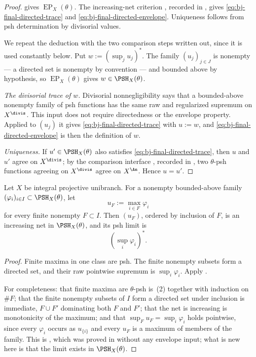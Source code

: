 \begin{proof}
 gives $\operatorname{EP}_X(\theta)$.
The increasing-net criterion
\cite[Theorem~5.11]{BJ22}, recorded in
, gives
\eqref{eq:bj-final-directed-trace} and
\eqref{eq:bj-final-directed-envelope}.
Uniqueness follows from psh determination by divisorial values.

We repeat the deduction with the two comparison steps written out, since it
is used constantly below.  Put $w:=(\sup_j u_j)^*$.  The family
$(u_j)_{j\in J}$ is nonempty --- a directed set is nonempty by convention
--- and bounded above by hypothesis, so
$\operatorname{EP}_X(\theta)$ gives $w\in\PSH_X(\theta)$.

\emph{The divisorial trace of $w$.}  Divisorial nonnegligibility
\cite[Theorem~5.6]{BJ22} says that a bounded-above nonempty family of psh
functions has the same raw and regularized supremum on $X^{\divis}$.
This input does not require directedness or the envelope property.
Applied to $(u_j)$ it gives
\eqref{eq:bj-final-directed-trace} with $u:=w$, and
\eqref{eq:bj-final-directed-envelope} is then the definition of $w$.

\emph{Uniqueness.}  If $u'\in\PSH_X(\theta)$ also satisfies
\eqref{eq:bj-final-directed-trace}, then $u$ and $u'$ agree on
$X^{\divis}$; by the comparison interface \cite[Theorem~4.22]{BJ22},
recorded in , two $\theta$-psh functions
agreeing on $X^{\divis}$ agree on $X^{\An}$.  Hence $u=u'$.
\end{proof}

\begin{corollary}\label{cor:bj-final-finite-maxima}
Let $X$ be integral projective unibranch.  For a nonempty bounded-above
family
$(\varphi_i)_{i\in I}\subset\PSH_X(\theta)$, let
\[
                         u_F:=\max_{i\in F}\varphi_i
\tag{45.7}\label{eq:bj-final-finite-maxima}
\]
for every finite nonempty $F\subset I$.
Then $(u_F)$, ordered by inclusion of $F$, is an increasing net in
$\PSH_X(\theta)$, and its psh limit is
\[
                         \left(\sup_i\varphi_i\right)^*.
\]
\end{corollary}

\begin{proof}
Finite maxima in one class are psh.
The finite nonempty subsets form a directed set, and their raw pointwise
supremum is $\sup_i\varphi_i$.
Apply .

For completeness: that finite maxima are $\theta$-psh is
\,(2) together with induction on $\#F$; that
the finite nonempty subsets of $I$ form a directed set under inclusion is
immediate, $F\cup F'$ dominating both $F$ and $F'$; that the net is
increasing is monotonicity of the maximum; and that
$\sup_Fu_F=\sup_i\varphi_i$ holds pointwise, since every $\varphi_i$
occurs as $u_{\{i\}}$ and every $u_F$ is a maximum of members of the
family.  This is , which was proved in
 without any envelope input; what is new here
is that the limit exists in $\PSH_X(\theta)$.
\end{proof}


